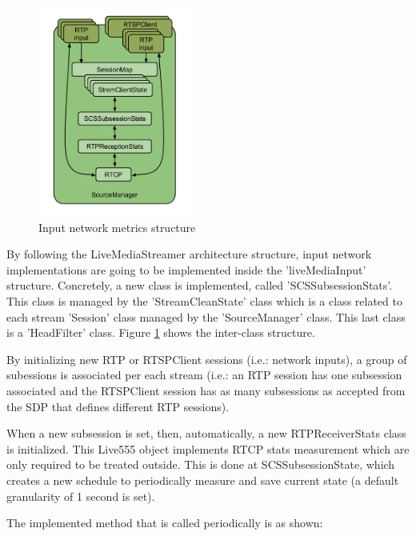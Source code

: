 \begin{figure}[!htb]
\begin{center}
\includegraphics[width=0.45\textwidth]{./images/SourceManager.png}
\caption{Input network metrics structure}
\label{F:inms}
\end{center}
\end{figure}

By following the LiveMediaStreamer architecture structure, input network implementations are going to be implemented inside the 'liveMediaInput' structure. Concretely, a new class is implemented, called 'SCSSubsessionStats'. This class is managed by the 'StreamCleanState' class which is a class related to each stream 'Session' class managed by the 'SourceManager' class. This last class is a 'HeadFilter' class. Figure \ref{F:inms} shows the inter-class structure.

By initializing new RTP or RTSPClient sessions (i.e.: network inputs), a group of subessions is associated per each stream (i.e.: an RTP session has one subsession associated and the RTSPClient session has as many subsessions as accepted from the SDP that defines different RTP sessions).

When a new subsession is set, then, automatically, a new RTPReceiverStats class is initialized. This Live555 object implements RTCP stats measurement which are only required to be treated outside. This is done at SCSSubsessionState, which creates a new schedule to periodically measure and save current state (a default granularity of 1 second is set).

The implemented method that is called periodically is as shown:

